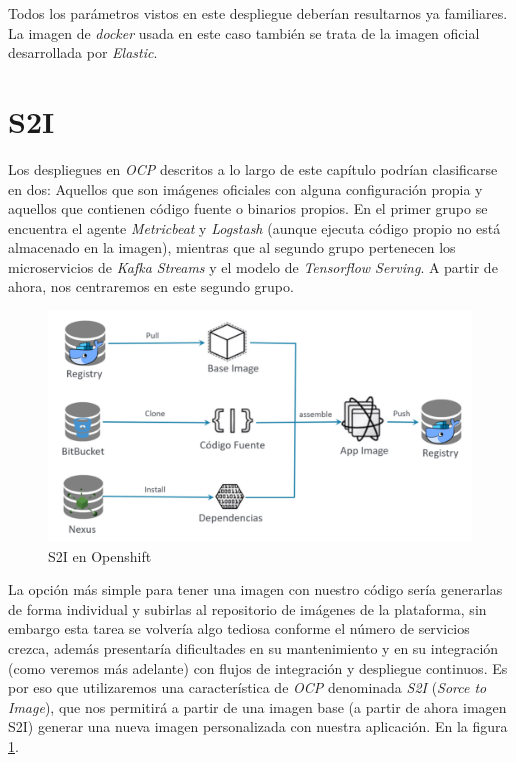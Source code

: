 Todos los parámetros vistos en este despliegue deberían resultarnos ya familiares. La imagen de \textit{docker} usada en este caso también se trata de la imagen oficial desarrollada por \textit{Elastic}.


\section{S2I}
\label{section:cont:s2i}
Los despliegues en \textit{OCP} descritos a lo largo de este capítulo podrían clasificarse en dos: Aquellos que son imágenes oficiales con alguna configuración propia y aquellos que contienen código fuente o binarios propios. En el primer grupo se encuentra el agente \textit{Metricbeat} y \textit{Logstash} (aunque ejecuta código propio no está almacenado en la imagen), mientras que al segundo grupo pertenecen los microservicios de \textit{Kafka Streams} y el modelo de \textit{Tensorflow Serving}. A partir de ahora, nos centraremos en este segundo grupo.


\begin{figure}[!ht]
	\centering
	\includegraphics[width=1\textwidth]{images/cont/s2i}
	\caption{S2I en Openshift}
	\label{fig:ocp-s2i}
\end{figure}

La opción más simple para tener una imagen con nuestro código sería generarlas de forma individual y subirlas al repositorio de imágenes de la plataforma, sin embargo esta tarea se volvería algo tediosa conforme el número de servicios crezca, además presentaría dificultades en su mantenimiento y en su integración (como veremos más adelante) con flujos de integración y despliegue continuos. Es por eso que utilizaremos una característica de \textit{OCP} denominada \textit{S2I} (\textit{Sorce to Image}), que nos permitirá a partir de una imagen base (a partir de ahora imagen S2I) generar una nueva imagen personalizada con nuestra aplicación. En la figura \ref{fig:ocp-s2i}.

